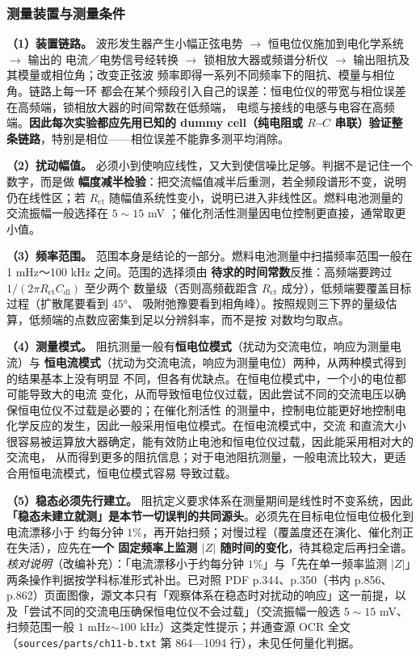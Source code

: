 \subsubsection{测量装置与测量条件}
\label{sec:ch11-eis-conditions}

\begin{measure}
\textbf{（1）装置链路。} 波形发生器产生小幅正弦电势 $\to$ 恒电位仪施加到电化学系统 $\to$ 输出的
电流／电势信号经转换 $\to$ 锁相放大器或频谱分析仪 $\to$ 输出阻抗及其模量或相位角；改变正弦波
频率即得一系列不同频率下的阻抗、模量与相位角。链路上每一环
都会在某个频段引入自己的误差：恒电位仪的带宽与相位误差在高频端，锁相放大器的时间常数在低频端，
电缆与接线的电感与电容在高频端。\textbf{因此每次实验都应先用已知的 dummy cell（纯电阻或
$R$–$C$ 串联）验证整条链路}，特别是相位——相位误差不能靠多测平均消除。

\textbf{（2）扰动幅值。} 必须小到使响应线性，又大到使信噪比足够。判据不是记住一个数字，而是做
\textbf{幅度减半检验}：把交流幅值减半后重测，若全频段谱形不变，说明仍在线性区；若 $R_{\mathrm{ct}}$
随幅值系统性变小，说明已进入非线性区。燃料电池测量的交流振幅一般选择在 $5\sim15$ mV
；催化剂活性测量因电位控制更直接，通常取更小值。

\textbf{（3）频率范围。} 范围本身是结论的一部分。燃料电池测量中扫描频率范围一般在
1 mHz～100 kHz 之间。范围的选择须由
\textbf{待求的时间常数}反推：高频端要跨过 $1/(2\pi R_{\mathrm{ct}}C_{\mathrm{dl}})$ 至少两个
数量级（否则高频截距含 $R_{\mathrm{ct}}$ 成分），低频端要覆盖目标过程（扩散尾要看到 $45$°、
吸附弛豫要看到相角峰）。按照规则三下界的量级估算，低频端的点数应密集到足以分辨斜率，而不是按
对数均匀取点。

\textbf{（4）测量模式。} 阻抗测量一般有\textbf{恒电位模式}（扰动为交流电位，响应为测量电流）与
\textbf{恒电流模式}（扰动为交流电流，响应为测量电位）两种，从两种模式得到的结果基本上没有明显
不同，但各有优缺点。在恒电位模式中，一个小的电位都可能导致大的电流
变化，从而导致恒电位仪过载，因此尝试不同的交流电压以确保恒电位仪不过载是必要的；在催化剂活性
的测量中，控制电位能更好地控制电化学反应的发生，因此一般采用恒电位模式。在恒电流模式中，交流
和直流大小很容易被运算放大器确定，能有效防止电池和恒电位仪过载，因此能采用相对大的交流电，
从而得到更多的阻抗信息；对于电池阻抗测量，一般电流比较大，更适合用恒电流模式，恒电位模式容易
导致过载。

\textbf{（5）稳态必须先行建立。} 阻抗定义要求体系在测量期间是线性时不变系统，因此
\textbf{「稳态未建立就测」是本节一切误判的共同源头}。必须先在目标电位恒电位极化到电流漂移小于
约每分钟 $1\%$，再开始扫频；对慢过程（覆盖度还在演化、催化剂正在失活），应先在\textbf{一个
固定频率上监测 $\lvert Z\rvert$ 随时间的变化}，待其稳定后再扫全谱。\emph{核对说明}（改编补充）：「电流漂移小于约每分钟 $1\%$」与「先在单一频率监测 $\lvert Z\rvert$」两条操作判据按学科标准形式补出。已对照 PDF p.344、p.350（书内 p.856、p.862）页面图像，源文本只有「观察体系在稳态时对扰动的响应」这一前提，以及「尝试不同的交流电压确保恒电位仪不会过载」（交流振幅一般选 $5\sim15$ mV、扫频范围一般 $1$ mHz$\sim100$ kHz）这类定性提示；并通查源 OCR 全文（\texttt{sources/parts/ch11-b.txt} 第 864—1094 行），未见任何量化判据。


\end{measure}
